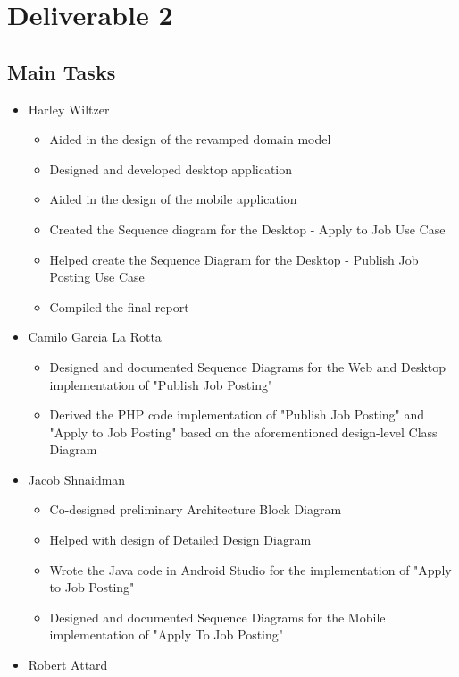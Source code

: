 \documentclass[12pt]{article}
\begin{document}
\newpage

\section{Deliverable 2}

\subsection{Main Tasks}

\begin{itemize}
    \item Harley Wiltzer
	\begin{itemize}
		\item Aided in the design of the revamped domain model
		\item Designed and developed desktop application
		\item Aided in the design of the mobile application
		\item Created the Sequence diagram for the Desktop - Apply to Job Use Case
		\item Helped create the Sequence Diagram for the Desktop - Publish Job Posting Use Case
		\item Compiled the final report
	\end{itemize}
    \item Camilo Garcia La Rotta
    \begin{itemize}
        \item Designed and documented Sequence Diagrams for the Web and Desktop implementation of "Publish Job Posting"
        \item Derived the PHP code implementation of "Publish Job Posting" and "Apply to Job Posting" based on the aforementioned design-level Class Diagram
    \end{itemize}
    \item Jacob Shnaidman
		\begin{itemize}
			\item Co-designed preliminary Architecture Block Diagram
            \item Helped with design of Detailed Design Diagram
            \item Wrote the Java code in Android Studio for the implementation of "Apply to Job Posting" 
            \item Designed and documented Sequence Diagrams for the Mobile implementation of "Apply To Job Posting"
		\end{itemize}
    \item Robert Attard

\end{itemize}
\end{document}
